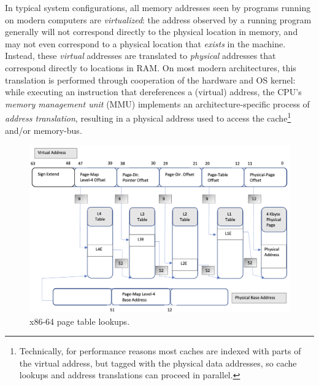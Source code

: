 \documentclass[acmsmall,screen,nonacm]{acmart}
\begin{document}
In typical system configurations, all memory addresses seen by programs running on modern computers are \emph{virtualized}: the address observed by a running program generally will not correspond directly to the physical location in memory, and may not even correspond to a physical location that \emph{exists} in the machine. Instead, these \emph{virtual} addresses are translated to \emph{physical} addresses that correspond directly to locations in RAM. On most modern architectures, this translation is performed through cooperation of the hardware and OS kernel: while executing an instruction that dereferences a (virtual) address, the CPU's \emph{memory management unit} (\textsc{MMU}) implements an architecture-specific process of \emph{address translation}, resulting in a physical address used to access the cache\footnote{Technically, for performance reasons most caches are indexed with parts of the virtual address, but tagged with the physical data addresses, so cache lookups and address translations can proceed in parallel.} and/or memory-bus.

\begin{figure}
    \includegraphics[width=\columnwidth]{pagetables.png}
    \caption{x86-64 page table lookups.}
    \label{fig:pagetables}
\end{figure}
\end{document}
